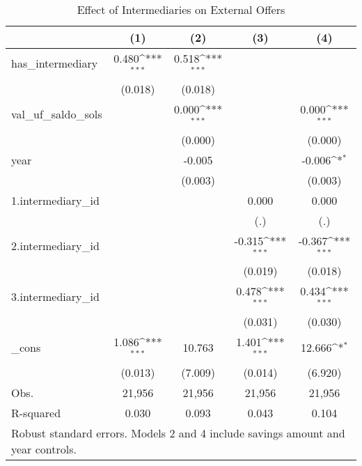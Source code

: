 \begin{table}[htbp]\centering
\def\sym#1{\ifmmode^{#1}\else\(^{#1}\)\fi}
\caption{Effect of Intermediaries on External Offers}
\begin{tabular}{l*{4}{c}}
\hline\hline
            &\multicolumn{1}{c}{(1)}         &\multicolumn{1}{c}{(2)}         &\multicolumn{1}{c}{(3)}         &\multicolumn{1}{c}{(4)}         \\
\hline
has\_intermediary&       0.480\sym{***}&       0.518\sym{***}&                     &                     \\
            &     (0.018)         &     (0.018)         &                     &                     \\
[1em]
val\_uf\_saldo\_sols&                     &       0.000\sym{***}&                     &       0.000\sym{***}\\
            &                     &     (0.000)         &                     &     (0.000)         \\
[1em]
year        &                     &      -0.005         &                     &      -0.006\sym{*}  \\
            &                     &     (0.003)         &                     &     (0.003)         \\
[1em]
1.intermediary\_id&                     &                     &       0.000         &       0.000         \\
            &                     &                     &         (.)         &         (.)         \\
[1em]
2.intermediary\_id&                     &                     &      -0.315\sym{***}&      -0.367\sym{***}\\
            &                     &                     &     (0.019)         &     (0.018)         \\
[1em]
3.intermediary\_id&                     &                     &       0.478\sym{***}&       0.434\sym{***}\\
            &                     &                     &     (0.031)         &     (0.030)         \\
[1em]
\_cons      &       1.086\sym{***}&      10.763         &       1.401\sym{***}&      12.666\sym{*}  \\
            &     (0.013)         &     (7.009)         &     (0.014)         &     (6.920)         \\
\hline
Obs.        &      21,956         &      21,956         &      21,956         &      21,956         \\
R-squared   &       0.030         &       0.093         &       0.043         &       0.104         \\
\hline\hline
\multicolumn{5}{l}{\footnotesize Robust standard errors. Models 2 and 4 include savings amount and year controls.}\\
\end{tabular}
\end{table}
